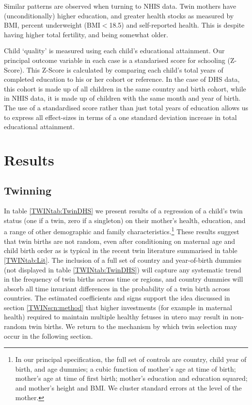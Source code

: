 \documentclass[subeqn]{article}
\begin{document}
\begin{spacing}{1.4}
Similar patterns are observed when turning to NHIS data.  Twin mothers have
(unconditionally) higher education, and greater health stocks as measured by
BMI, percent underweight (BMI$<$18.5) and self-reported health.  This is 
despite having higher total fertility, and being somewhat older.

Child `quality' is measured using each child's educational attainment. Our 
principal outcome variable in each case is a standarised score for schooling 
(Z-Score). This Z-Score is calculated by comparing each child's total years of 
completed education to his or her cohort or reference.  In the case of DHS data,
this cohort is made up of all children in the same country and birth cohort, 
while in NHIS data, it is made up of children with the same month and year of 
birth. The use of a standardised score rather than just total years of education
allows us to express all effect-sizes in terms of a one standard deviation 
increase in total educational attainment.

\section{Results}                                  \label{TWINscn:results}
\subsection{Twinning}                              \label{TWINsscn:twinning}
In table \ref{TWINtab:TwinDHS} we present results of a regression of a child's 
twin status (one if a twin, zero if a singleton) on their mother's health, 
education, and a range of other demographic and family characteristics.\footnote{
In our principal specification, the full set of controls are country, child year 
of birth, and age dummies; a cubic function of mother's age at time of birth; 
mother's age at time of first birth; mother's education and education squared; 
and mother's height and BMI. We cluster standard errors at the level of the 
mother.}  These results suggest that twin births are not random, even after 
conditioning on maternal age and child birth order as is typical in the recent 
twin literature summarised in table \ref{TWINtab:Lit}. The inclusion of a full 
set of country and year-of-birth dummies (not displayed in table 
\ref{TWINtab:TwinDHS}) will capture any systematic trend in the frequency of 
twin births across time or regions, and country dummies will absorb all time 
invariant differences in the probability of a twin birth across countries. The 
estimated coefficients and signs support the idea discussed in section 
\ref{TWINscn:method} that higher investments (for example in maternal health) 
required to maintain multiple healthy fetuses in utero may result in non-random 
twin births. We return to the mechanism by which twin selection may occur in 
the following section.


\end{spacing}
\end{document}

